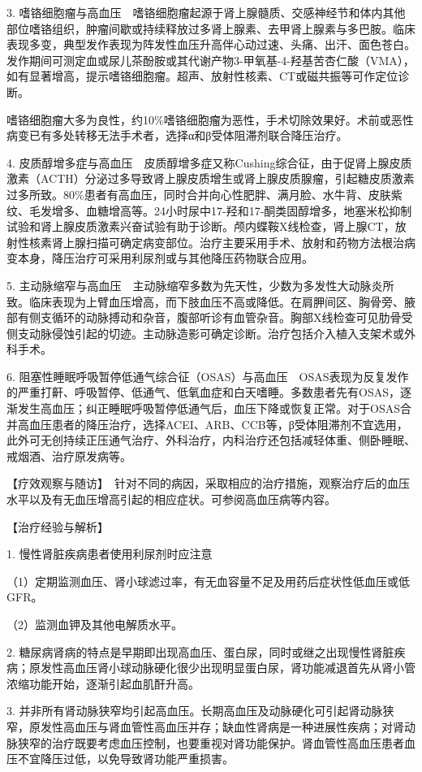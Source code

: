 3.
嗜铬细胞瘤与高血压　嗜铬细胞瘤起源于肾上腺髓质、交感神经节和体内其他部位嗜铬组织，肿瘤间歇或持续释放过多肾上腺素、去甲肾上腺素与多巴胺。临床表现多变，典型发作表现为阵发性血压升高伴心动过速、头痛、出汗、面色苍白。发作期间可测定血或尿儿茶酚胺或其代谢产物3-甲氧基-4-羟基苦杏仁酸（VMA），如有显著增高，提示嗜铬细胞瘤。超声、放射性核素、CT或磁共振等可作定位诊断。

嗜铬细胞瘤大多为良性，约10\%嗜铬细胞瘤为恶性，手术切除效果好。术前或恶性病变已有多处转移无法手术者，选择α和β受体阻滞剂联合降压治疗。

4.
皮质醇增多症与高血压　皮质醇增多症又称Cushing综合征，由于促肾上腺皮质激素（ACTH）分泌过多导致肾上腺皮质增生或肾上腺皮质腺瘤，引起糖皮质激素过多所致。80\%患者有高血压，同时合并向心性肥胖、满月脸、水牛背、皮肤紫纹、毛发增多、血糖增高等。24小时尿中17-羟和17-酮类固醇增多，地塞米松抑制试验和肾上腺皮质激素兴奋试验有助于诊断。颅内蝶鞍X线检查，肾上腺CT，放射性核素肾上腺扫描可确定病变部位。治疗主要采用手术、放射和药物方法根治病变本身，降压治疗可采用利尿剂或与其他降压药物联合应用。

5.
主动脉缩窄与高血压　主动脉缩窄多数为先天性，少数为多发性大动脉炎所致。临床表现为上臂血压增高，而下肢血压不高或降低。在肩胛间区、胸骨旁、腋部有侧支循环的动脉搏动和杂音，腹部听诊有血管杂音。胸部X线检查可见肋骨受侧支动脉侵蚀引起的切迹。主动脉造影可确定诊断。治疗包括介入植入支架术或外科手术。

6.
阻塞性睡眠呼吸暂停低通气综合征（OSAS）与高血压　OSAS表现为反复发作的严重打鼾、呼吸暂停、低通气、低氧血症和白天嗜睡。多数患者先有OSAS，逐渐发生高血压；纠正睡眠呼吸暂停低通气后，血压下降或恢复正常。对于OSAS合并高血压患者的降压治疗，选择ACEI、ARB、CCB等，β受体阻滞剂不宜选用，此外可无创持续正压通气治疗、外科治疗，内科治疗还包括减轻体重、侧卧睡眠、戒烟酒、治疗原发病等。

【疗效观察与随访】　针对不同的病因，采取相应的治疗措施，观察治疗后的血压水平以及有无血压增高引起的相应症状。可参阅高血压病等内容。

【治疗经验与解析】

1. 慢性肾脏疾病患者使用利尿剂时应注意

（1）定期监测血压、肾小球滤过率，有无血容量不足及用药后症状性低血压或低GFR。

（2）监测血钾及其他电解质水平。

2.
糖尿病肾病的特点是早期即出现高血压、蛋白尿，同时或继之出现慢性肾脏疾病；原发性高血压肾小球动脉硬化很少出现明显蛋白尿，肾功能减退首先从肾小管浓缩功能开始，逐渐引起血肌酐升高。

3.
并非所有肾动脉狭窄均引起高血压。长期高血压及动脉硬化可引起肾动脉狭窄，原发性高血压与肾血管性高血压并存；缺血性肾病是一种进展性疾病；对肾动脉狭窄的治疗既要考虑血压控制，也要重视对肾功能保护。肾血管性高血压患者血压不宜降压过低，以免导致肾功能严重损害。


